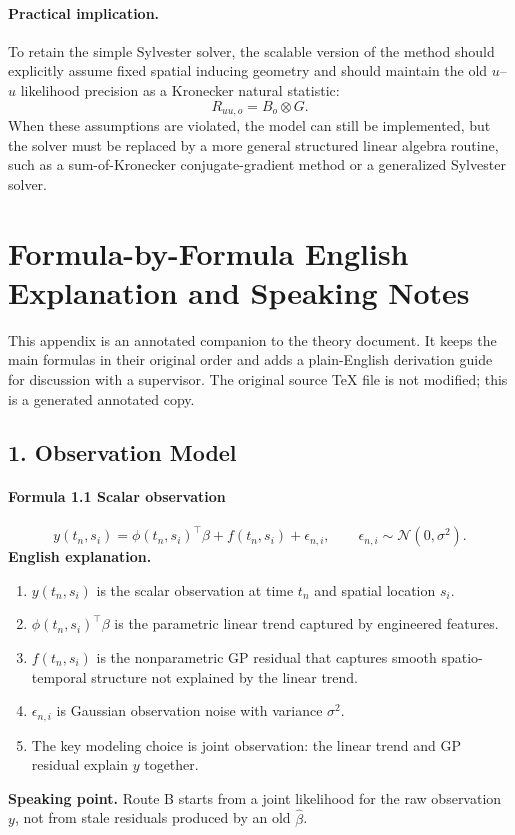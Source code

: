 \documentclass[12pt]{article}
\begin{document}
\paragraph{Practical implication.}
To retain the simple Sylvester solver, the scalable version of the method
should explicitly assume fixed spatial inducing geometry and should
maintain the old $u$--$u$ likelihood precision as a Kronecker natural statistic:
\begin{equation}
    R_{uu,o}=B_o\otimes G.
\end{equation}
When these assumptions are violated, the model can still be implemented,
but the solver must be replaced by a more general structured linear
algebra routine, such as a sum-of-Kronecker conjugate-gradient method or a
generalized Sylvester solver.

\clearpage
\section{Formula-by-Formula English Explanation and Speaking Notes}
This appendix is an annotated companion to the theory document. It keeps the main formulas in their original order and adds a plain-English derivation guide for discussion with a supervisor. The original source TeX file is not modified; this is a generated annotated copy.

\subsection{1. Observation Model}
\paragraph{Formula 1.1 Scalar observation}
\[
y(t_n,s_i)=\phi(t_n,s_i)^\top\beta+f(t_n,s_i)+\epsilon_{n,i},
\qquad
\epsilon_{n,i}\sim\mathcal N(0,\sigma^2).
\]
\textbf{English explanation.}
\begin{enumerate}[leftmargin=2em]
\item \(y(t_n,s_i)\) is the scalar observation at time \(t_n\) and spatial location \(s_i\).
\item \(\phi(t_n,s_i)^\top\beta\) is the parametric linear trend captured by engineered features.
\item \(f(t_n,s_i)\) is the nonparametric GP residual that captures smooth spatio-temporal structure not explained by the linear trend.
\item \(\epsilon_{n,i}\) is Gaussian observation noise with variance \(\sigma^2\).
\item The key modeling choice is joint observation: the linear trend and GP residual explain \(y\) together.
\end{enumerate}
\textbf{Speaking point.} Route B starts from a joint likelihood for the raw observation \(y\), not from stale residuals produced by an old \(\hat\beta\).
\end{document}
